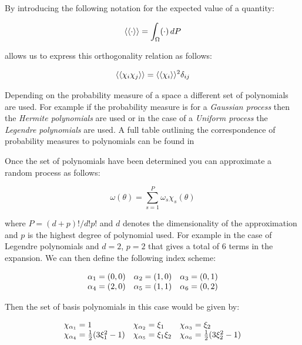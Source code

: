 By introducing the following notation for the expected value of a quantity:

\begin{equation}\label{eq:oned-stochastic-expect-notation}
    \left\langle\langle\cdot\right\rangle\rangle = \int_{\Omega}(\cdot) \,dP
\end{equation}

allows us to express this orthogonality relation as follows:

\begin{equation}\label{oned-stochastic-orthog-relation}
    \left\langle\langle\chi_i\chi_j\right\rangle\rangle = \left\langle\langle\chi_i\right\rangle\rangle^2\delta_{ij}
\end{equation}

Depending on the probability measure of a space a different set of polynomials
are used. For example if the probability measure is for a
\textit{Gaussian process} then the \textit{Hermite polynomials} are used or in
the case of a \textit{Uniform process} the \textit{Legendre polynomials} are
used. A full table outlining the correspondence of probability measures to
polynomials can be found in \cite{general-poly-chaos}

Once the set of polynomials have been determined you can approximate a random
process as follows:

\begin{equation}
    \omega(\theta) = \sum_{s=1}^P\omega_s\chi_s(\theta)
\end{equation}

where $P = (d + p)!/d!p!$ and $d$ denotes the dimensionality of the
approximation and $p$ is the highest degree of polynomial used. For example in
the case of Legendre polynomials and $d=2$, $p=2$ that gives a total of 6
terms in the expansion. We can then define the following index scheme:

\begin{equation}
  \begin{array}{c c c }
    \alpha_1 = (0,0) & \alpha_2 = (1,0) & \alpha_3 = (0,1) \\
    \alpha_4 = (2,0) & \alpha_5 = (1,1) & \alpha_6 = (0,2)
  \end{array}
\end{equation}

Then the set of basis polynomials in this case would be given by:

\begin{equation}
  \begin{array}{l l l}
    \chi_{\alpha_1} = 1 & \chi_{\alpha_2} = \xi_1 & \chi_{\alpha_3} = \xi_2 \\
    \chi_{\alpha_4} = \frac{1}{2}(3\xi_1^2 - 1) &
    \chi_{\alpha_5} = \xi_1\xi_2 &
    \chi_{\alpha_6} = \frac{1}{2}(3\xi_2^2 - 1)
  \end{array}
\end{equation}

